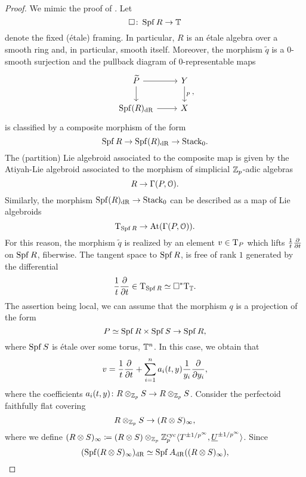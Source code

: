\documentclass[10pt,a4paper]{amsart}
\numberwithin{equation}{subsection}
\theoremstyle{definition}
\begin{document}
\begin{proof}
    We mimic the proof of \cite[Lemma 7.2.9]{nuiten2017koszul}. Let 
        \[
            \square \colon \operatorname{Spf} R \to \mathbb T  
        \]
    denote the fixed (\'etale) framing. In particular, $R$ is an \'etale algebra over a smooth ring and, in particular, smooth itself. Moreover, the morphism $\widetilde{q}$ is a $0$-smooth surjection and the pullback diagram of $0$-representable maps
        \[
        \begin{tikzcd}
            \tP \ar{r} \ar{d} & Y \ar{d}{p} \\
            \Spf (R)_\dR \ar{r} & X  
        \end{tikzcd},
        \]
    is classified by a composite morphism of the form
        \[
            \operatorname{Spf} R \to \operatorname{Spf} (R)_{\mathrm{dR}} \to \mathrm{Stack}_0.
        \]
    The (partition) Lie algebroid associated to the composite map is given by the Atiyah-Lie algebroid associated to the morphism of simplicial $\mathbb Z_p$-adic algebras
        \[
            R \to \Gamma(P, \mathcal{O}) .
        \]
    Similarly, the morphism $ \operatorname{Spf} (R)_{\mathrm{dR}} \to \mathrm{Stack}_0$ can be described as a map of Lie algebroids
        \[
            \mathrm T_{\operatorname{Spf} R} \to \mathrm{At}(\Gamma(P, \mathcal{O})).  
        \]
    For this reason, the morphism $\tilde{q}$ is realized by an element $v \in \mathrm T_P$ which lifts $\frac{1}{t} \frac{\partial}{\partial t}$ on $\operatorname{Spf} R$, fiberwise.
    The tangent space to $\operatorname{Spf} R$, is free of rank $1$ generated by the differential
        \[
            \frac{1}{t} \frac{\partial}{\partial t} \in \mathrm T_{\operatorname{Spf} R} \simeq \square^* \mathrm T_{\mathbb T} .  
        \]
    The assertion being local, we can assume that the morphism $q$ is a projection of the form
        \[
            P \simeq \operatorname{Spf} R \times \operatorname{Spf} S \to \operatorname{Spf} R,    
        \]
    where $\operatorname{Spf} S $ is \'etale over some torus, $\mathbb T^n$. In this case, we obtain that
        \begin{equation} \label{eq:vector_field_v}
            v = \frac{1}{t} \frac{\partial}{\partial t} + \sum_{i = 1}^n a_i(t, y) \frac{1}{y_i} \frac{\partial}{\partial y_i},
        \end{equation}
    where the coefficients $a_i(t, y) \colon R \otimes_{\mathbb Z_p} S \to R \otimes_{\mathbb Z_p} S$. Consider the perfectoid faithfully flat covering
        \[
            R \otimes_{\mathbb Z_p} S \to (R \otimes S)_\infty  ,
        \]
    where we define $(R \otimes S)_\infty \coloneqq ( R \otimes S) \otimes_{\mathbb Z_p} \mathbb Z_p^{\mathrm{cyc}} \langle T^{\pm 1/p^\infty}, \underline{U}^{\pm 1/p^\infty} \rangle$. 
    Since
        \[
            (\operatorname{Spf} (R \otimes S)_\infty)_{\mathrm{dR}} \simeq \operatorname{Spf} A_{\mathrm{dR}}((R \otimes S)_\infty),
\]
\end{proof}
\end{document}
